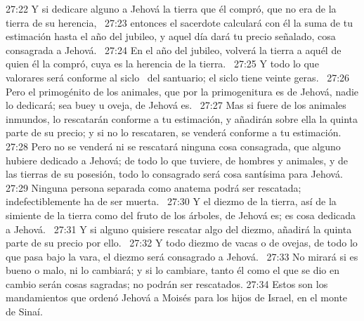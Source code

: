 27:22 Y si dedicare alguno a Jehová la tierra que él compró, que no era de la tierra de su herencia,  
27:23 entonces el sacerdote calculará con él la suma de tu estimación hasta el año del jubileo, y aquel día dará tu precio señalado, cosa consagrada a Jehová.  
27:24 En el año del jubileo, volverá la tierra a aquél de quien él la compró, cuya es la herencia de la tierra.  
27:25 Y todo lo que valorares será conforme al siclo  del santuario; el siclo tiene veinte geras.  
27:26 Pero el primogénito de los animales, que por la primogenitura es de Jehová, nadie lo dedicará; sea buey u oveja, de Jehová es.  
27:27 Mas si fuere de los animales inmundos, lo rescatarán conforme a tu estimación, y añadirán sobre ella la quinta parte de su precio; y si no lo rescataren, se venderá conforme a tu estimación.  
27:28 Pero no se venderá ni se rescatará ninguna cosa consagrada, que alguno hubiere dedicado a Jehová; de todo lo que tuviere, de hombres y animales, y de las tierras de su posesión, todo lo consagrado será cosa santísima para Jehová.  
27:29 Ninguna persona separada como anatema podrá ser rescatada; indefectiblemente ha de ser muerta.  
27:30 Y el diezmo de la tierra, así de la simiente de la tierra como del fruto de los árboles, de Jehová es; es cosa dedicada a Jehová.  
27:31 Y si alguno quisiere rescatar algo del diezmo, añadirá la quinta parte de su precio por ello.  
27:32 Y todo diezmo de vacas o de ovejas, de todo lo que pasa bajo la vara, el diezmo será consagrado a Jehová.  
27:33 No mirará si es bueno o malo, ni lo cambiará; y si lo cambiare, tanto él como el que se dio en cambio serán cosas sagradas; no podrán ser rescatados. 
27:34 Estos son los mandamientos que ordenó Jehová a Moisés para los hijos de Israel, en el monte de Sinaí.